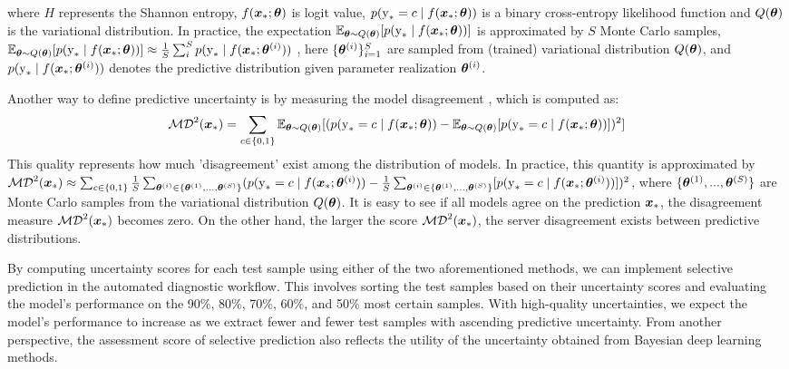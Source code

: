 \documentclass[10pt]{article} %
\begin{document}
where $H$ represents the Shannon entropy, $f({\bm{x}}_*;{\bm{\theta}})$ is logit value, $p({\textnormal{y}}_*=c \mid f({\bm{x}}_* ; {\bm{\theta}}))$ is a binary cross-entropy likelihood function and $Q({\bm{\theta}})$ is the variational distribution. In practice, the expectation $\mathbb{E}_{{\bm{\theta}} \sim Q({\bm{\theta}})}[p({\textnormal{y}}_* \mid f({\bm{x}}_* ; {\bm{\theta}}))]$ is approximated by $S$ Monte Carlo samples,
$\mathbb{E}_{{\bm{\theta}} \sim Q({\bm{\theta}})}[p({\textnormal{y}}_* \mid f({\bm{x}}_* ; {\bm{\theta}}))] \approx \frac{1}{S} \sum_i^S p({\textnormal{y}}_* \mid f({\bm{x}}_* ; {\bm{\theta}}^{(i)}))$ , here $\{{\bm{\theta}}^{(i)}\}_{i=1}^S$ are sampled from (trained) variational distribution $Q({\bm{\theta}})$, and $p({\textnormal{y}}_* \mid f({\bm{x}}_* ; {\bm{\theta}}^{(i)}))$ denotes the predictive distribution given parameter realization ${\bm{\theta}}^{\left(i\right)}$.

Another way to define predictive uncertainty is by measuring the model disagreement \citep{d2021repulsive}, which is computed as:
\begin{equation}
    \mathcal{MD}^2 ({\bm{x}}_*) = \sum_{c \in\{0,1\}} \mathbb{E}_{{\bm{\theta}} \sim Q({\bm{\theta}})}[(p({\textnormal{y}}_*=c \mid f({\bm{x}}_*; {\bm{\theta}})) - \mathbb{E}_{{\bm{\theta}} \sim Q({\bm{\theta}})}[p({\textnormal{y}}_* = c\mid f({\bm{x}}_* ; {\bm{\theta}}))])^2]
\end{equation}
This quality represents how much 'disagreement' exist among the distribution of models. In practice, this quantity is approximated by $\mathcal{MD}^2({\bm{x}}_*) \approx \sum_{c \in\{0,1\}} \frac{1}{S}\sum_{{\bm{\theta}}^{(i)} \in\{{\bm{\theta}}^{(1)},...,{\bm{\theta}}^{(S)}\}} (p({\textnormal{y}}_*=c \mid f({\bm{x}}_*; {\bm{\theta}}^{(i)})) - \frac{1}{S}\sum_{{\bm{\theta}}^{(i)} \in\{{\bm{\theta}}^{(1)},...,{\bm{\theta}}^{(S)}\}}[p({\textnormal{y}}_* = c\mid f({\bm{x}}_* ; {\bm{\theta}}^{(i)}))])^2$, where $\{{\bm{\theta}}^{(1)},...,{\bm{\theta}}^{(S)}\}$ are Monte Carlo samples from the variational distribution $Q({\bm{\theta}})$. It is easy to see if all models agree on the prediction ${\bm{x}}_*$, the disagreement measure $\mathcal{MD}^2 ({\bm{x}}_*)$ becomes zero. On the other hand, the larger the score $\mathcal{MD}^2 ({\bm{x}}_*)$, the server disagreement exists between predictive distributions.

By computing uncertainty scores for each test sample using either of the two aforementioned methods, we can implement selective prediction in the automated diagnostic workflow. This involves sorting the test samples based on their uncertainty scores and evaluating the model's performance on the 90\%, 80\%, 70\%, 60\%, and 50\% most certain samples. With high-quality uncertainties, we expect the model's performance to increase as we extract fewer and fewer test samples with ascending predictive uncertainty. From another perspective, the assessment score of selective prediction also reflects the utility of the uncertainty obtained from Bayesian deep learning methods.
\end{document}
